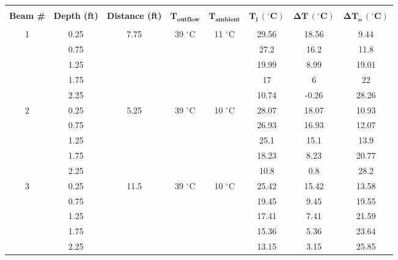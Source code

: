 \documentclass{article}
\begin{document}
\begin{center}
\singlespacing
\begin{tabular}{|c|ccccccc|}
    \hline
    & & & & & & & \\
    \textbf{Beam \#} & \textbf{Depth (ft)} & \textbf{Distance (ft)} & \textbf{$\bm{T_\textbf{outflow}}$} & \textbf{$\bm{T_\textbf{ambient}}$} & \textbf{$\bm{T_\textbf{i}}\,\bm{(^\circ\textbf{C})}$} & \textbf{$\bm{\Delta T}\,\bm{(^\circ\textbf{C})}$} & \textbf{$\bm{\Delta T_o}\,\bm{(^\circ\textbf{C})}$} \\
    & & & & & & & \\\hline
    \multirow{ 5}{*}{1}     & 0.25  & \multirow{ 5}{*}{7.75}       & \multirow{ 5}{*}{39 $^\circ$C}       & \multirow{ 5}{*}{11 $^\circ$C}        & 29.56 & 18.56   & 9.44        \\
           & 0.75  &      &         &         & 27.2  & 16.2    & 11.8        \\
           & 1.25  &      &         &        & 19.99 & 8.99    & 19.01       \\
           & 1.75  &      &         &         & 17    & 6       & 22          \\
           & 2.25  &      &         &        & 10.74 & -0.26   & 28.26       \\\hline
    \multirow{ 5}{*}{2}        & 0.25  & \multirow{ 5}{*}{5.25}          & \multirow{ 5}{*}{39 $^\circ$C}        & \multirow{ 5}{*}{10 $^\circ$C}         & 28.07 & 18.07   & 10.93       \\
           & 0.75  &      &         &         & 26.93 & 16.93   & 12.07       \\
           & 1.25  &      &         &        & 25.1  & 15.1    & 13.9        \\
           & 1.75  &      &         &         & 18.23 & 8.23    & 20.77       \\
           & 2.25  &      &         &         & 10.8  & 0.8     & 28.2        \\\hline
    \multirow{ 5}{*}{3}        & 0.25  & \multirow{ 5}{*}{11.5}          & \multirow{ 5}{*}{39 $^\circ$C}        & \multirow{ 5}{*}{10 $^\circ$C}         & 25.42 & 15.42   & 13.58       \\
           & 0.75  &      &         &         & 19.45 & 9.45    & 19.55       \\
           & 1.25  &     &         &         & 17.41 & 7.41    & 21.59       \\
           & 1.75  &      &         &         & 15.36 & 5.36    & 23.64       \\
           & 2.25  &      &         &         & 13.15 & 3.15    & 25.85       \\\hline

\end{tabular}
\end{center}
\end{document}
